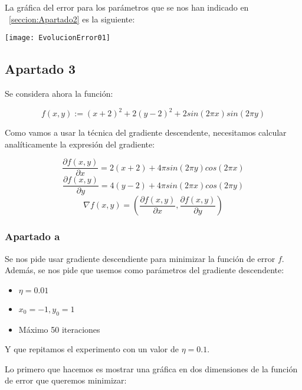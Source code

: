 \documentclass[11pt]{article}
\begin{document}
La gráfica del error para los parámetros que se nos han indicado en ~\ref{seccion:Apartado2} es la siguiente:

\texttt{[image: EvolucionError01]}

\subsection{Apartado 3}

Se considera ahora la función:

\begin{displaymath}
    f(x,y) := (x+2)^2 + 2(y-2)^2 + 2 sin(2\pi x) sin(2 \pi y)
\end{displaymath}

Como vamos a usar la técnica del gradiente descendente, necesitamos calcular analíticamente la expresión del gradiente:

\begin{displaymath}
    \frac{\partial f(x,y)}{\partial x} = 2(x+2) + 4 \pi sin(2 \pi y) cos(2 \pi x)
\end{displaymath}
\begin{displaymath}
    \frac{\partial f(x,y)}{\partial y} = 4(y - 2) + 4 \pi sin(2 \pi x) cos(2 \pi y)
\end{displaymath}
\begin{displaymath}
    \nabla f(x, y) = (\frac{\partial f(x,y)}{\partial x}, \frac{\partial f(x,y)}{\partial y})
\end{displaymath}

\subsubsection{Apartado a}

Se nos pide usar gradiente descendiente para minimizar la función de error $f$. Además, se nos pide que usemos como parámetros del gradiente descendente:

\begin{itemize}
    \item $\eta = 0.01$
    \item $x_0 = -1, y_0 = 1$
    \item Máximo 50 iteraciones
\end{itemize}

Y que repitamos el experimento con un valor de $\eta = 0.1$.

Lo primero que hacemos es mostrar una gráfica en dos dimensiones de la función de error que queremos minimizar:
\end{document}
